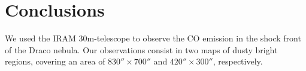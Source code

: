 \documentclass[traditabstract]{aa}
\begin{document}
%




\section{Conclusions}
\label{sec:conclusion}

   We used the IRAM 30m-telescope to observe the CO emission in the shock front of the Draco nebula. Our observations consist in two maps of dusty bright regions, covering an area of $830''\times 700''$ and $420''\times 300''$, respectively.
\end{document}
